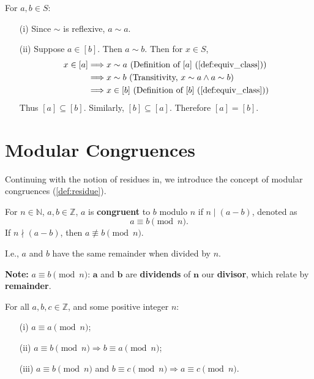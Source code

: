 \begin{Proof}
    For $a,b \in S$:
        \begin{itemize}
            \item[(i)]  Since $\sim$ is reflexive, $a \sim a$.
            \item[(ii)] Suppose $a \in [b]$. Then $a \sim b$. Then for $x \in S$,
                        \begin{align*}
                            x \in [a]&\Longrightarrow x \sim a \text{ (Definition of $[a]$ (\ref{def:equiv_class}))} \\
                            &\Longrightarrow x \sim b \text{ (Transitivity, $x\sim a\land a\sim b$)} \\
                            &\Longrightarrow x \in [b] \text{ (Definition of $[b]$ (\ref{def:equiv_class}))}
                        \end{align*}
                        Thus $[a] \subseteq [b]$. Similarly, $[b] \subseteq [a]$. Therefore $[a] = [b]$.
        \end{itemize}
\end{Proof}

\section{Modular Congruences}
Continuing with the notion of residues in, we introduce the concept of modular congruences (\ref{def:residue}). 

\begin{Def}

    \label{def:mod_cong}

    For $n \in \mathbb{N}$, $a, b \in \mathbb{Z}$, $a$ is \textbf{congruent} to $b$ modulo $n$ if $n \mid (a - b)$, denoted as
    \[
        a \equiv b \pmod{n}.
    \]
    If $n\nmid (a-b)$, then $a \not\equiv b \pmod{n}$.
\end{Def}
\noindent
I.e., $a$ and $b$ have the same remainder when divided by $n$.
\begin{Note}
    \textbf{Note:} $a \equiv b \pmod{n}$: $\mathbf{a}$ and $\mathbf{b}$ are \textbf{dividends} of $\mathbf{n}$ our \textbf{divisor}, which relate by \textbf{remainder}.
\end{Note}
\begin{theo}

    For all \(a, b, c \in \mathbb{Z}\), and some positive integer $n$:
\begin{itemize}
    \item[(i)] \( a \equiv a \pmod{n} \);
    \item[(ii)] \( a \equiv b \pmod{n} \Longrightarrow b \equiv a \pmod{n} \);
    \item[(iii)] \( a \equiv b \pmod{n} \) and \( b \equiv c \pmod{n} \Longrightarrow a \equiv c \pmod{n} \).
\end{itemize}

\end{theo}

